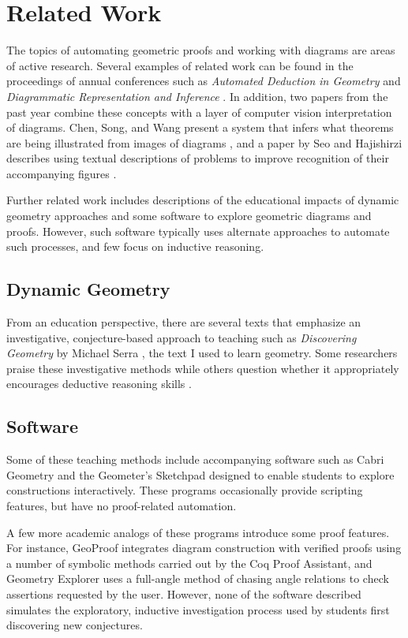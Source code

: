 \chapter{Related Work}

The topics of automating geometric proofs and working with diagrams
are areas of active research.  Several examples of related work can be
found in the proceedings of annual conferences such as \emph{Automated
  Deduction in Geometry} \cite{autoDeduction} and \emph {Diagrammatic
  Representation and Inference} \cite{diagramInference}.  In addition,
two papers from the past year combine these concepts with a layer of
computer vision interpretation of diagrams.  Chen, Song, and Wang
present a system that infers what theorems are being illustrated from
images of diagrams \cite{fromImages}, and a paper by Seo and
Hajishirzi describes using textual descriptions of problems to improve
recognition of their accompanying figures \cite{diagramUnderstanding}.

Further related work includes descriptions of the educational impacts
of dynamic geometry approaches and some software to explore geometric
diagrams and proofs.  However, such software typically uses alternate
approaches to automate such processes, and few focus on inductive
reasoning.

\section{Dynamic Geometry}
From an education perspective, there are several texts that emphasize
an investigative, conjecture-based approach to teaching such as
\emph{Discovering Geometry} by Michael Serra \cite{serraDiscovering},
the text I used to learn geometry.  Some researchers praise these
investigative methods \cite{geoTransformations} while others question
whether it appropriately encourages deductive reasoning skills
\cite{geoTeaching}.

\section{Software}
Some of these teaching methods include accompanying software such as
Cabri Geometry \cite{cabri} and the Geometer's Sketchpad
\cite{geoSketchpad} designed to enable students to explore
constructions interactively.  These programs occasionally provide
scripting features, but have no proof-related automation.

A few more academic analogs of these programs introduce some proof
features.  For instance, GeoProof \cite{geoProof} integrates diagram
construction with verified proofs using a number of symbolic methods
carried out by the Coq Proof Assistant, and Geometry Explorer
\cite{geoExplorer} uses a full-angle method of chasing angle relations
to check assertions requested by the user.  However, none of the
software described simulates the exploratory, inductive investigation
process used by students first discovering new conjectures.

